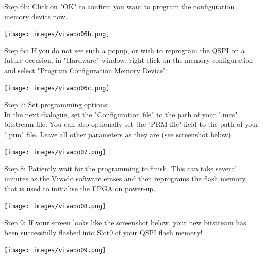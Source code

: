 \begin{minipage}{\linewidth}
  Step 6b: Click on "OK" to confirm you want to program the configuration memory device now.
  \begin{center}
    \texttt{[image: images/vivado06b.png]}
  \end{center}
\end{minipage}

\begin{minipage}{\linewidth}
  Step 6c: If you do not see such a popup, or wish to reprogram the QSPI on a future occasion, in "Hardware" window, right click on the memory configuration and select "Program Configuration Memory Device":
  \begin{center}
    \texttt{[image: images/vivado06c.png]}
  \end{center}
\end{minipage}

\begin{minipage}{\linewidth}
  Step 7: Set programming options: \\
  In the next dialogue, set the "Configuration file" to the path of your ".mcs" bitstream file. You can also optionally set the "PRM file" field to the path of your ".prm" file. Leave all other parameters
  as they are (see screenshot below).
  \\
  \begin{center}
    \texttt{[image: images/vivado07.png]}
  \end{center}
\end{minipage}

\vspace{1mm}

\begin{minipage}{\linewidth}
  Step 8: Patiently wait for the programming to finish.
  This can take several minutes as the Vivado software erases
  and then reprograms the flash memory that is used to
  initialise the FPGA on power-up.
  \\
  \begin{center}
    \texttt{[image: images/vivado08.png]}
  \end{center}
\end{minipage}


\begin{minipage}{\linewidth}
Step 9: If your screen looks like the screenshot below,
your new bitstream has been successfully flashed into Slot0 of your QSPI flash memory!
  \\
  \begin{center}
    \texttt{[image: images/vivado09.png]}
  \end{center}
\end{minipage}

